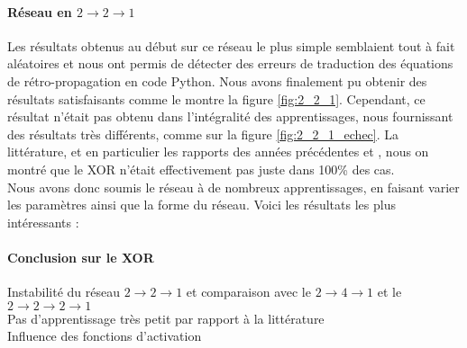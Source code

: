 \paragraph{Réseau en $2\rightarrow2\rightarrow1$} %

Les résultats obtenus au début sur ce réseau le plus simple semblaient tout à fait aléatoires et nous ont permis de détecter des erreurs de traduction des équations de rétro-propagation en code Python. Nous avons finalement pu obtenir des résultats satisfaisants comme le montre la figure \ref{fig:2_2_1}. Cependant, ce résultat n'était pas obtenu dans l'intégralité des apprentissages, nous fournissant des résultats très différents, comme sur la figure \ref{fig:2_2_1_echec}. La littérature, et en particulier les rapports des années précédentes \cite{appartement} et \cite{Pinaple}, nous on montré que le XOR n'était effectivement pas juste dans 100\% des cas.\\
Nous avons donc soumis le réseau à de nombreux apprentissages, en faisant varier les paramètres ainsi que la forme du réseau. Voici les résultats les plus intéressants :


\paragraph{Conclusion sur le XOR} %
\label{par:conclusion_sur_le_xor}
Instabilité du réseau $2\rightarrow2\rightarrow1$ et comparaison avec le $ 2 \rightarrow 4 \rightarrow 1 $ et le $2 \rightarrow 2 \rightarrow 2 \rightarrow 1 $ \\
Pas d'apprentissage très petit par rapport à la littérature\\
Influence des fonctions d'activation
